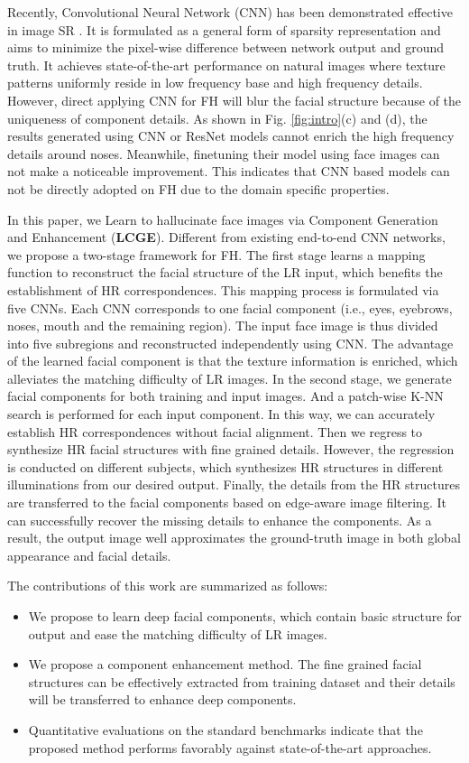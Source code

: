 \documentclass{article}
\begin{document}
Recently, Convolutional Neural Network (CNN) has been demonstrated effective in image SR \cite{chao-pami2015-srcnn}. It is formulated as a general form of sparsity representation \cite{jianchao-tip10-scsr} and aims to minimize the pixel-wise difference between network output and ground truth. It achieves state-of-the-art performance on natural images where texture patterns uniformly reside in low frequency base and high frequency details. However, direct applying CNN for FH will blur the facial structure because of the uniqueness of component details. As shown in Fig. \ref{fig:intro}(c) and (d), the results generated using CNN \cite{chao-pami2015-srcnn} or ResNet \cite{ledig-cvpr17-gan} models cannot enrich the high frequency details around noses. Meanwhile, finetuning their model using face images can not make a noticeable improvement. This indicates that CNN based models can not be directly adopted on FH due to the domain specific properties.

In this paper, we Learn to hallucinate face images via Component Generation and Enhancement (\textbf{LCGE}). Different from existing end-to-end CNN networks, we propose a two-stage framework for FH. The first stage learns a mapping function to reconstruct the facial structure of the LR input, which benefits the establishment of HR correspondences. This mapping process is formulated via five CNNs. Each CNN corresponds to one facial component (i.e., eyes, eyebrows, noses, mouth and the remaining region). The input face image is thus divided into five subregions and reconstructed independently using CNN. The advantage of the learned facial component is that the texture information is enriched, which alleviates the matching difficulty of LR images. In the second stage, we generate facial components for both training and input images. And a patch-wise K-NN search is performed for each input component. In this way, we can accurately establish HR correspondences without facial alignment. Then we regress to synthesize HR facial structures with fine grained details. However, the regression is conducted on different subjects, which synthesizes HR structures in different illuminations from our desired output. Finally, the details from the HR structures are transferred to the facial components based on edge-aware image filtering. It can successfully recover the missing details to enhance the components. As a result, the output image well approximates the ground-truth image in both global appearance and facial details.

The contributions of this work are summarized as follows:
\begin{itemize}
  \item We propose to learn deep facial components, which contain basic structure for output and ease the matching difficulty of LR images.
  \item We propose a component enhancement method. The fine grained facial structures can be effectively extracted from training dataset and their details will be transferred to enhance deep components.
  \item Quantitative evaluations on the standard benchmarks indicate that the proposed method performs favorably against state-of-the-art approaches.
\end{itemize}
\end{document}
